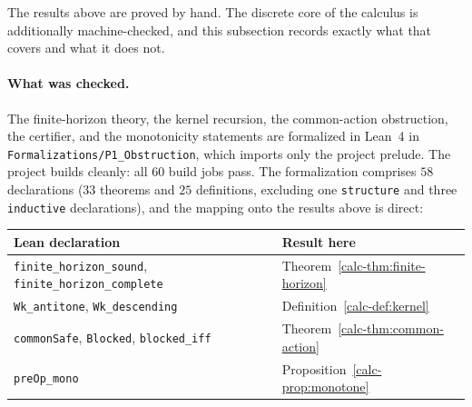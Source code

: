 \documentclass[10pt,twocolumn]{article}
\theoremstyle{definition}
\begin{document}
The results above are proved by hand. The discrete core of the calculus is
additionally machine-checked, and this subsection records exactly what that covers and
what it does not.

\paragraph{What was checked.} The finite-horizon theory, the kernel recursion, the
common-action obstruction, the certifier, and the monotonicity statements are formalized in Lean~4 in \texttt{Formalizations/P1\_Obstruction}, which imports only the
project prelude. The project builds cleanly: all \(60\) build jobs pass. The formalization comprises \(58\) declarations (\(33\) theorems and \(25\) definitions, excluding one \texttt{structure} and three \texttt{inductive} declarations), and the mapping onto the results above is
direct:

\begin{center}
\begin{tabular}{@{}ll@{}}
\toprule
Lean declaration & Result here\\
\midrule
\texttt{finite\_horizon\_sound}, \texttt{finite\_horizon\_complete} & Theorem~\ref{calc-thm:finite-horizon}\\
\texttt{Wk\_antitone}, \texttt{Wk\_descending} & Definition~\ref{calc-def:kernel}\\
\texttt{commonSafe}, \texttt{Blocked}, \texttt{blocked\_iff} & Theorem~\ref{calc-thm:common-action}\\
\texttt{preOp\_mono} & Proposition~\ref{calc-prop:monotone}\\
\bottomrule
\end{tabular}
\end{center}
\end{document}
